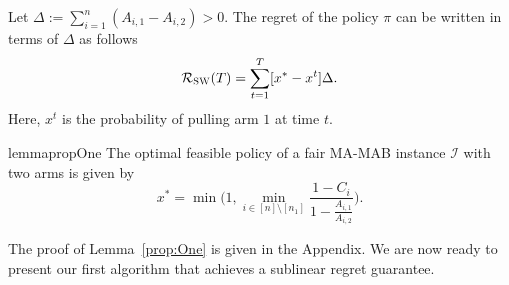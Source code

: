 Let $\Delta:=\sum_{i=1}^n (A_{i,1} - A_{i,2}) >0$. The regret of the policy $\pi$  can be written in terms of $\Delta$ as follows  
\begin{equation}
    \mathcal{R}_\textsc{SW}(T) = \sum_{t=1}^T [x^* - x^t] \Delta. 
    \label{eq:eqnClosedFormSW}
\end{equation}
Here, $x^t$ is the probability of pulling arm $1$ at time $t$. 


\begin{restatable}{lemma}{propOne} The optimal feasible policy of a  fair MA-MAB instance  $\mathcal{I}$ with two arms is given by 
\label{prop:One}
    \begin{equation}
    x^* = \min  \Bigg ( 1, \min_{i \in [n] \setminus [n_1]}\frac{ 1- C_i}{ 1- \frac{A_{i,1}}{A_{i,2}}} \Bigg ).
    \end{equation}
\end{restatable}





The proof of Lemma~\ref{prop:One} is given in the Appendix. We are now ready to present our first algorithm that achieves a  sublinear regret guarantee. 

